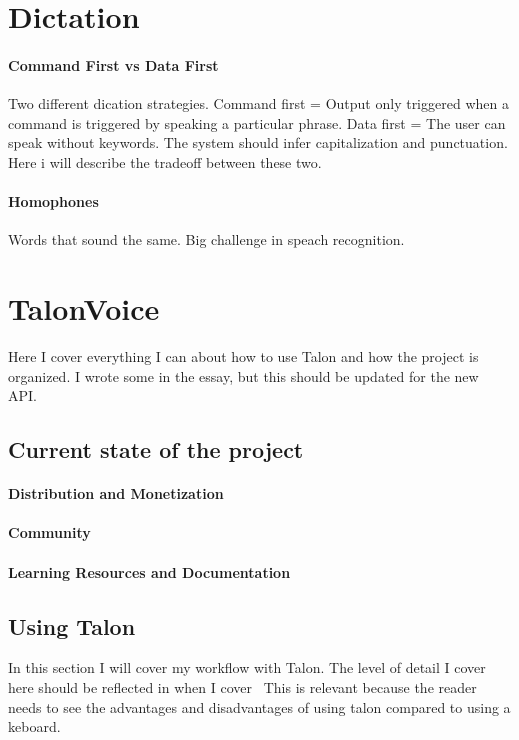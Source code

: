 \documentclass[a4paper,english]{ifimaster}
\begin{document}
\section{Dictation}
\paragraph{Command First vs Data First}
Two different dication strategies.
Command first = Output only triggered when a command is triggered by speaking a particular phrase.
Data first = The user can speak without keywords. The system should infer capitalization and punctuation.
Here i will describe the tradeoff between these two.
\paragraph{Homophones}
Words that sound the same. Big challenge in speach recognition.


\section{TalonVoice}
Here I cover everything I can about how to use Talon and how the project is organized.
I wrote some in the essay, but this should be updated for the new API.

\subsection{Current state of the project}
\paragraph{Distribution and Monetization}
\paragraph{Community}
\paragraph{Learning Resources and Documentation}

\subsection{Using Talon}
In this section I will cover my workflow with Talon.
The level of detail I cover here should be reflected in when I cover~
This is relevant because the reader needs to see the advantages and disadvantages of using talon compared to using a keboard.
\end{document}
